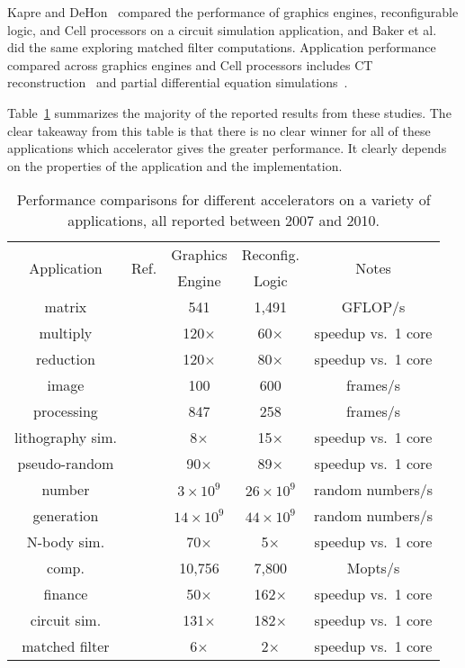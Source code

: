 Kapre and DeHon~\cite{kd09} compared the performance of graphics engines,
reconfigurable logic, and Cell processors on a circuit simulation application,
and Baker et al.~\cite{bgt07} did the same exploring matched filter
computations.
Application performance compared across graphics engines and Cell processors
includes CT reconstruction~\cite{skkh07} and
partial differential equation simulations~\cite{rd10}.

Table~\ref{tbl:compare} summarizes the majority of the
reported results from these studies.
The clear takeaway from this table is that there is no clear winner
for all of these applications which accelerator gives the greater performance.
It clearly depends on the properties of the application and the implementation.

\begin{table}[ht]
\centering
\caption{Performance comparisons for different accelerators on a variety of applications, all reported between 2007 and 2010.}
\label{tbl:compare}
\vspace{0.1in} 
\begin{tabular}{c | c | c | c | c }
\multirow{2}{*}{Application} & \multirow{2}{*}{Ref.} & Graphics & Reconfig. & \multirow{2}{*}{Notes} \\
  &   & Engine & Logic &  \\ \hline
matrix & \cite{cmhm10} & 541 & 1,491 & GFLOP/s\\
multiply  & \cite{jpbc10} & 120$\times$ & 60$\times$ & speedup vs.~1 core\\ \hline
reduction  & \cite{jpbc10} & 120$\times$ & 80$\times$ & speedup vs.~1 core\\ \hline
image & \cite{amy09} & 100 & 600 & frames/s \\
processing & \cite{bnw+10} & 847 & 258 & frames/s \\ \hline
lithography sim. & \cite{cz09} & 8$\times$ & 15$\times$ & speedup vs.~1 core\\ \hline
pseudo-random & \cite{jpbc10} & 90$\times$ & 89$\times$ & speedup vs.~1 core\\ 
number  & \cite{tb09} & $3\times10^9$ & $26\times10^9$ & random numbers/s\\
generation & \cite{thl09} & $14\times10^9$ & $44\times10^9$ & random numbers/s\\ \hline
N-body sim.  & \cite{jpbc10} & 70$\times$ & 5$\times$ & speedup vs.~1 core\\ \hline
comp.& \cite{cmhm10} & 10,756 & 7,800 & Mopts/s\\
finance  & \cite{tb10} & 50$\times$ & 162$\times$ & speedup vs.~1 core\\ \hline
circuit sim. & \cite{kd09} & 131$\times$ & 182$\times$ & speedup vs.~1 core\\ \hline
matched filter  & \cite{bgt07} & 6$\times$ & 2$\times$ & speedup vs.~1 core\\
\end{tabular}
\end{table}

